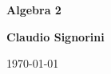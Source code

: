 \begin{titlepage}
	\begin{center}
		\vspace*{1cm}
		
		\Huge
		\textbf{Algebra 2}
		
		\vspace{1.5cm}
		
		\LARGE
		\textbf{Claudio Signorini}
		
		\today
		
		\vspace{0.5cm}
		
		\vfill
		
	\end{center}
\end{titlepage}